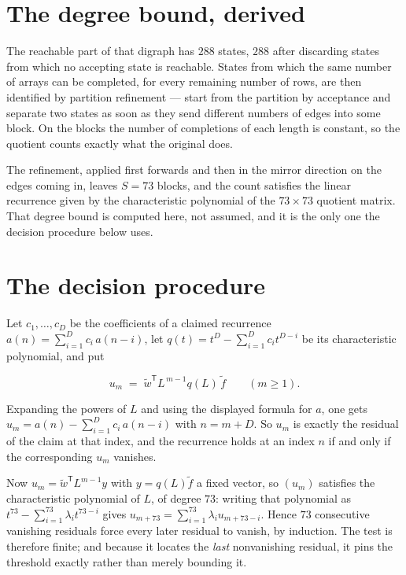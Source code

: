 \documentclass[11pt]{article}
\theoremstyle{definition}
\begin{document}
\section{The degree bound, derived}

The reachable part of that digraph has $288$ states, $288$ after discarding states from which no accepting state is reachable. States from which the same number of arrays can be completed, for every remaining number of rows, are then identified by partition refinement --- start from the partition by acceptance and separate two states as soon as they send different numbers of edges into some block. On the blocks the number of completions of each length is constant, so the quotient counts exactly what the original does.

The refinement, applied first forwards and then in the mirror direction on the edges coming in, leaves $S = 73$ blocks, and the count satisfies the linear recurrence given by the characteristic polynomial of the $73 \times 73$ quotient matrix. That degree bound is computed here, not assumed, and it is the only one the decision procedure below uses.

\section{The decision procedure}

Let $c_1,\dots,c_D$ be the coefficients of a claimed recurrence $a(n) = \sum_{i=1}^{D} c_i\,a(n-i)$, let $q(t) = t^{D} - \sum_{i=1}^{D} c_i t^{D-i}$ be its characteristic polynomial, and put

\[u_m \;=\; \tilde w^{\mathsf T} L^{\,m-1} q(L)\,\tilde f \qquad (m \ge 1).\]

Expanding the powers of $L$ and using the displayed formula for $a$, one gets $u_m = a(n) - \sum_{i=1}^{D} c_i\,a(n-i)$ with $n = m + D$. So $u_m$ is exactly the residual of the claim at that index, and the recurrence holds at an index $n$ if and only if the corresponding $u_m$ vanishes.

Now $u_m = \tilde w^{\mathsf T} L^{m-1} y$ with $y = q(L)\tilde f$ a fixed vector, so $(u_m)$ satisfies the characteristic polynomial of $L$, of degree $73$: writing that polynomial as $t^{73} - \sum_{i=1}^{73} \lambda_i t^{73-i}$ gives $u_{m+73} = \sum_{i=1}^{73} \lambda_i u_{m+73-i}$. Hence $73$ consecutive vanishing residuals force every later residual to vanish, by induction. The test is therefore finite; and because it locates the {\itshape last} nonvanishing residual, it pins the threshold exactly rather than merely bounding it.
\end{document}
